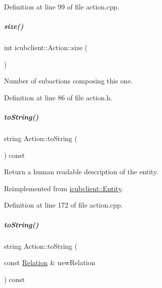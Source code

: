 Definition at line 99 of file action.\+cpp.

\mbox{\label{group__icubclient__representations_a6f97f36aa3e072445f24774c2e0d9dcd}} 
\subparagraph{\texorpdfstring{size()}{size()}}
{\footnotesize\ttfamily int icubclient\+::\+Action\+::size (\begin{DoxyParamCaption}{ }\end{DoxyParamCaption})\hspace{0.3cm}{\ttfamily [inline]}}



Number of subactions composing this one. 



Definition at line 86 of file action.\+h.

\mbox{\label{group__icubclient__representations_a725d45d77d48e73135956e1aadfe3889}} 
\subparagraph{\texorpdfstring{to\+String()}{toString()}\hspace{0.1cm}{\footnotesize\ttfamily [1/2]}}
{\footnotesize\ttfamily string Action\+::to\+String (\begin{DoxyParamCaption}{ }\end{DoxyParamCaption}) const\hspace{0.3cm}{\ttfamily [virtual]}}



Return a human readable description of the entity. 



Reimplemented from \hyperlink{group__icubclient__representations_ad578a93701121f00ac7079fafad6c0e1}{icubclient\+::\+Entity}.



Definition at line 172 of file action.\+cpp.

\mbox{\label{group__icubclient__representations_a0db8acde84f6986ea158f865ba752d40}} 
\subparagraph{\texorpdfstring{to\+String()}{toString()}\hspace{0.1cm}{\footnotesize\ttfamily [2/2]}}
{\footnotesize\ttfamily string Action\+::to\+String (\begin{DoxyParamCaption}\item[{const \hyperlink{group__icubclient__representations_classicubclient_1_1Relation}{Relation} \&}]{new\+Relation }\end{DoxyParamCaption}) const\hspace{0.3cm}{\ttfamily [virtual]}}



